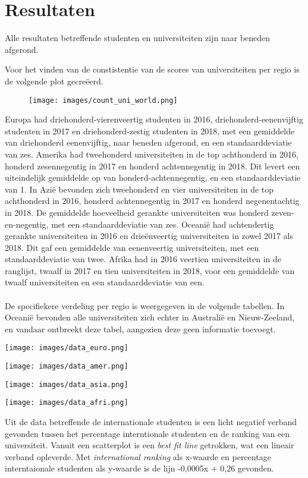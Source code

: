 \documentclass{uva-inf-article}
\begin{document}
\section*{Resultaten}
Alle resultaten betreffende studenten en universiteiten zijn naar beneden afgerond.

Voor het vinden van de constistentie van de scores van universiteiten per regio is de volgende plot gecreëerd.\\
\begin{figure}[h]
\texttt{[image: images/count\_uni\_world.png]}\\
\end{figure} 
Europa had driehonderd-vierenveertig studenten in 2016, driehonderd-eenenvijftig studenten in 2017 en driehonderd-zestig studenten in 2018, met een gemiddelde van driehonderd eenenvijftig, naar beneden afgerond, en een standaarddeviatie van zes. Amerika had tweehonderd universiteiten in de top achthonderd in 2016, honderd zesennegentig in 2017 en honderd achtennegentig in 2018. Dit levert een uiteindelijk gemiddelde op van honderd-achtennegentig, en een standaarddeviatie van 1. In Azië bevonden zich tweehonderd en vier universiteiten in de top achthonderd in 2016, honderd achtennegentig in 2017 en honderd negenentachtig in 2018. De gemiddelde hoeveelheid gerankte universiteiten was honderd zeven-en-negentig, met een standaarddeviatie van zes. Oceanië had achtendertig gerankte universiteiten in 2016 en drieënveertig universiteiten in zowel 2017 als 2018. Dit gaf een gemiddelde van eenenveertig universiteiten, met een standaarddeviatie van twee. Afrika had in 2016 veertien universiteiten in de ranglijst, twaalf in 2017 en tien universiteiten in 2018, voor een gemiddelde van twaalf universiteiten en een standaarddeviatie van een. 
\\
\\
De specifiekere verdeling per regio is weergegeven in de volgende tabellen. In Oceanië bevonden alle universiteiten zich echter in Australië en Nieuw-Zeeland, en vandaar ontbreekt deze tabel, aangezien deze geen informatie toevoegt.
\begin{center}
\texttt{[image: images/data\_euro.png]}

\texttt{[image: images/data\_amer.png]}

\texttt{[image: images/data\_asia.png]}


\texttt{[image: images/data\_afri.png]}
\end{center}
Uit de data betreffende de internationale studenten is een licht negatief verband gevonden tussen het percentage interntionale studenten en de ranking van een universiteit. Vanuit een scatterplot is een \textit{best fit line} getrokken, wat een lineair verband opleverde. Met \textit{international ranking} als x-waarde en percentage interntaionale studenten als y-waarde is de lijn -0,0005x + 0,26 gevonden.\\
\end{document}
